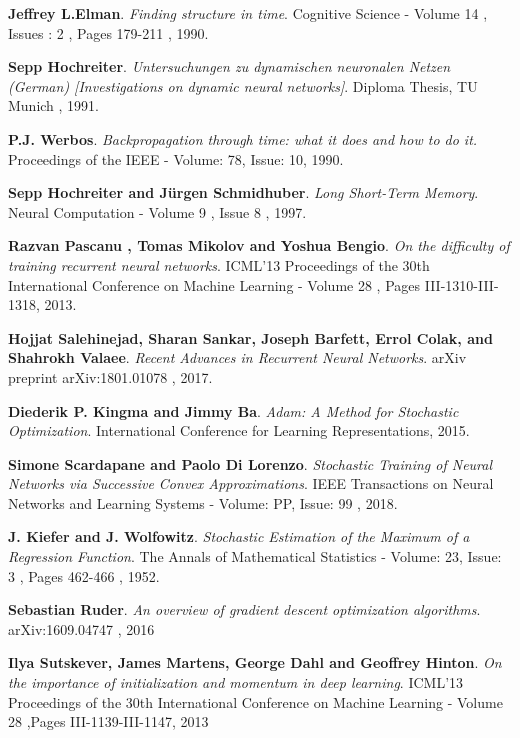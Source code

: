 \documentclass[12pt]{report}
\begin{document}
\begin{thebibliography}{9}

\textbf{Jeffrey L.Elman}.
\textit{Finding structure in time}. 
Cognitive Science - Volume 14 , Issues : 2 , Pages 179-211 , 1990.

\textbf{Sepp Hochreiter}.
\textit{Untersuchungen zu dynamischen neuronalen Netzen (German) [Investigations on dynamic neural networks]}. 
Diploma Thesis, TU Munich , 1991.

\textbf{P.J. Werbos}. 
\textit{Backpropagation through time: what it does and how to do it.} 
 Proceedings of the IEEE - Volume: 78, Issue: 10, 1990.
 
\textbf{Sepp Hochreiter and Jürgen Schmidhuber}.
\textit{Long Short-Term Memory}. 
Neural Computation - Volume 9  , Issue 8 , 1997. 

\textbf{Razvan Pascanu , Tomas Mikolov and 	Yoshua Bengio}.
\textit{On the difficulty of training recurrent neural networks}. 
ICML'13 Proceedings of the 30th International Conference on Machine Learning - Volume 28  , Pages III-1310-III-1318, 2013. 

\textbf{Hojjat Salehinejad, Sharan Sankar, Joseph Barfett, Errol Colak, and Shahrokh Valaee}.
\textit{Recent Advances in Recurrent Neural Networks}. 
 arXiv preprint arXiv:1801.01078 , 2017.
 

\textbf{Diederik P. Kingma and Jimmy Ba}.
\textit{Adam: A Method for Stochastic Optimization}. 
International Conference for Learning Representations, 2015.

\textbf{Simone Scardapane and Paolo Di Lorenzo}.
\textit{Stochastic Training of Neural Networks via Successive Convex Approximations}. 
 IEEE Transactions on Neural Networks and Learning Systems - Volume: PP, Issue: 99 , 2018.


\textbf{J. Kiefer and J. Wolfowitz}.
\textit{Stochastic Estimation of the Maximum of a Regression Function}. 
The Annals of Mathematical Statistics - Volume: 23, Issue: 3 , Pages 462-466 , 1952.

\textbf{Sebastian Ruder}.
\textit{An overview of gradient descent optimization algorithms}. 
arXiv:1609.04747 , 2016

\textbf{Ilya Sutskever, James Martens, George Dahl and Geoffrey Hinton}.
\textit{On the importance of initialization and momentum in deep learning}. 
ICML'13 Proceedings of the 30th International Conference on Machine Learning - Volume 28 ,Pages III-1139-III-1147, 2013


\end{thebibliography}
\end{document}
